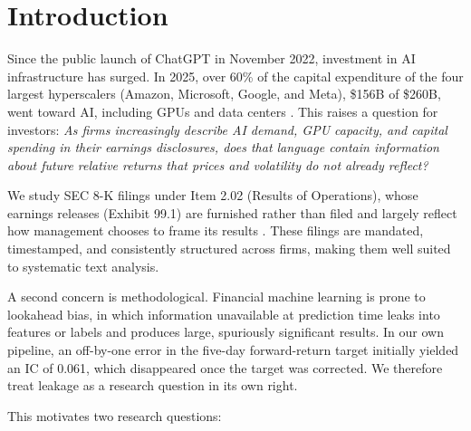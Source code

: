\documentclass[10pt,letterpaper,twocolumn]{article}
\begin{document}
\section{Introduction}
Since the public launch of ChatGPT in November 2022, investment in AI infrastructure has surged. In 2025, over 60\% of the capital expenditure of the four largest hyperscalers (Amazon, Microsoft, Google, and Meta), \$156B of \$260B, went toward AI, including GPUs and data centers \cite{shieldops2025hyperscaler}. This raises a question for investors: \textit{As firms increasingly describe AI demand, GPU capacity, and capital spending in their earnings disclosures, does that language contain information about future relative returns that prices and volatility do not already reflect?}

We study SEC 8-K filings under Item 2.02 (Results of Operations), whose earnings releases (Exhibit 99.1) are furnished rather than filed and largely reflect how management chooses to frame its results \cite{sec_form8k}. These filings are mandated, timestamped, and consistently structured across firms, making them well suited to systematic text analysis.

A second concern is methodological. Financial machine learning is prone to lookahead bias, in which information unavailable at prediction time leaks into features or labels and produces large, spuriously significant results. In our own pipeline, an off-by-one error in the five-day forward-return target initially yielded an IC of 0.061, which disappeared once the target was corrected. We therefore treat leakage as a research question in its own right.

\noindent This motivates two research questions:

\noindent\setlength{\fboxsep}{4pt}
\end{document}
